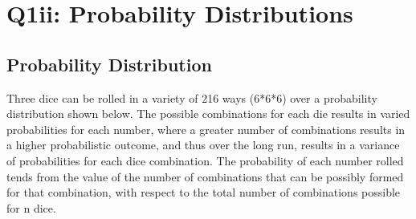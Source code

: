\documentclass[12pt]{article}
\begin{document}
\section{Q1ii: Probability Distributions}
\subsection{Probability Distribution}
Three dice can be rolled in a variety of 216 ways (6*6*6) over a probability distribution shown below. The possible combinations for each die results in varied probabilities for each number, where a greater number of combinations results in a higher probabilistic outcome, and thus over the long run, results in a variance of probabilities for each dice combination. The probability of each number rolled tends from the value of the number of combinations that can be possibly formed for that combination, with respect to the total number of combinations possible for n dice.
\end{document}
